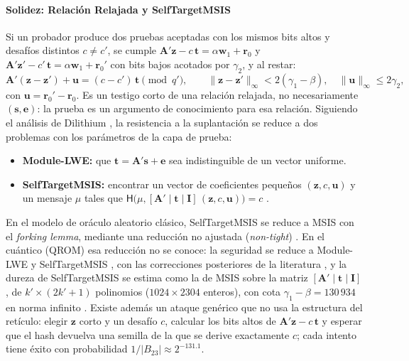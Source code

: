 \paragraph{Solidez: Relación Relajada y SelfTargetMSIS}
Si un probador produce dos pruebas aceptadas con los mismos bits altos y desafíos distintos $c \neq c'$, se cumple $\mathbf{A}'\mathbf{z} - c\,\mathbf{t} = \alpha\mathbf{w}_1 + \mathbf{r}_0$ y $\mathbf{A}'\mathbf{z}' - c'\,\mathbf{t} = \alpha\mathbf{w}_1 + \mathbf{r}_0'$ con bits bajos acotados por $\gamma_2$, y al restar:
\begin{equation}
\mathbf{A}'(\mathbf{z} - \mathbf{z}') + \mathbf{u} = (c - c')\,\mathbf{t} \pmod{q'}, \qquad
\|\mathbf{z} - \mathbf{z}'\|_\infty < 2(\gamma_1 - \beta), \quad \|\mathbf{u}\|_\infty \le 2\gamma_2,
\end{equation}
con $\mathbf{u} = \mathbf{r}_0' - \mathbf{r}_0$. Es un testigo corto de una relación relajada, no necesariamente $(\mathbf{s}, \mathbf{e})$: la prueba es un argumento de conocimiento para esa relación. Siguiendo el análisis de Dilithium \cite{bai2021dilithium, kiltz2018concrete}, la resistencia a la suplantación se reduce a dos problemas con los parámetros de la capa de prueba:
\begin{itemize}
    \item \textbf{Module-LWE:} que $\mathbf{t} = \mathbf{A}'\mathbf{s} + \mathbf{e}$ sea indistinguible de un vector uniforme.
    \item \textbf{SelfTargetMSIS:} encontrar un vector de coeficientes pequeños $(\mathbf{z}, c, \mathbf{u})$ y un mensaje $\mu$ tales que $\mathsf{H}\big(\mu, [\mathbf{A}' \mid \mathbf{t} \mid \mathbf{I}]\,(\mathbf{z}, c, \mathbf{u})\big) = c$ \cite{bai2021dilithium}.
\end{itemize}
En el modelo de oráculo aleatorio clásico, SelfTargetMSIS se reduce a MSIS con el \textit{forking lemma}, mediante una reducción no ajustada (\textit{non-tight}) \cite{pointcheval2000security, bai2021dilithium}. En el cuántico (QROM) esa reducción no se conoce: la seguridad se reduce a Module-LWE y SelfTargetMSIS \cite{kiltz2018concrete}, con las correcciones posteriores de la literatura \cite{devevey2023detailed, barbosa2023fixing}, y la dureza de SelfTargetMSIS se estima como la de MSIS sobre la matriz $[\mathbf{A}' \mid \mathbf{t} \mid \mathbf{I}]$, de $k' \times (2k'+1)$ polinomios ($1024 \times 2304$ enteros), con cota $\gamma_1 - \beta = 130\,934$ en norma infinito \cite{bai2021dilithium}. Existe además un ataque genérico que no usa la estructura del retículo: elegir $\mathbf{z}$ corto y un desafío $c$, calcular los bits altos de $\mathbf{A}'\mathbf{z} - c\,\mathbf{t}$ y esperar que el hash devuelva una semilla de la que se derive exactamente $c$; cada intento tiene éxito con probabilidad $1/|B_{23}| \approx 2^{-131.1}$.

